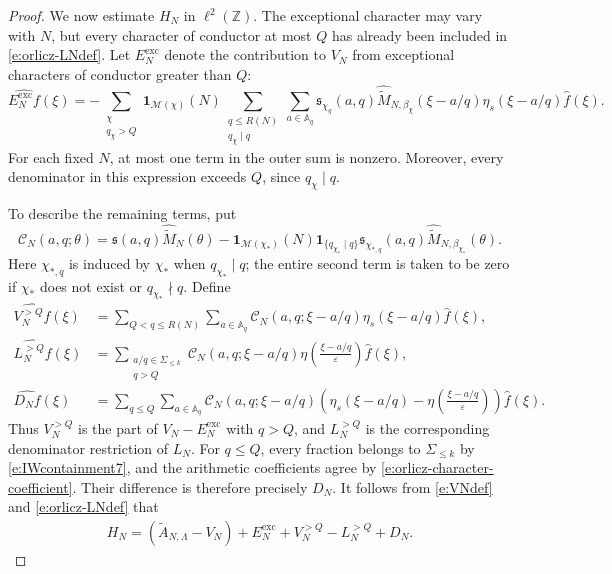 \documentclass[12pt,reqno]{amsart}
\numberwithin{equation}{section}
\theoremstyle{definition}
\theoremstyle{remark}
\begin{document}
\begin{proof}
We now estimate \(H_N\) in \(\ell^2(\mathbb Z)\).
The exceptional character may vary with \(N\), but every character
of conductor at most \(Q\) has already been included in
\eqref{e:orlicz-LNdef}. Let \(E_N^{\mathrm{exc}}\) denote the
contribution to \(V_N\) from exceptional characters of conductor
greater than \(Q\):
\[
 \widehat{E_N^{\mathrm{exc}}f}(\xi)
 =
 -
 \sum_{\substack{\chi\\q_\chi>Q}}
 \mathbf1_{\mathcal M(\chi)}(N)
 \sum_{\substack{q\leq R(N)\\q_\chi\mid q}}
 \sum_{a\in\mathbb A_q}
 \mathfrak s_{\chi_q}(a,q)
 \widehat{\widetilde M}_{N,\beta_\chi}(\xi-a/q)
 \eta_s(\xi-a/q)\widehat f(\xi).
\]
For each fixed \(N\), at most one term in the outer sum is nonzero.
Moreover, every denominator in this expression exceeds \(Q\),
since \(q_\chi\mid q\).

To describe the remaining terms, put
\[
 \mathcal C_N(a,q;\theta)
 =
 \mathfrak s(a,q)\widehat{\widetilde M}_N(\theta)
 -
 \mathbf1_{\mathcal M(\chi_*)}(N)
 \mathbf1_{\{q_{\chi_*}\mid q\}}
 \mathfrak s_{\chi_{*,q}}(a,q)
 \widehat{\widetilde M}_{N,\beta_{\chi_*}}(\theta).
\]
Here \(\chi_{*,q}\) is induced by \(\chi_*\) when
\(q_{\chi_*}\mid q\); the entire second term is taken to be zero
if \(\chi_*\) does not exist or \(q_{\chi_*}\nmid q\).
Define
\begin{align*}
 \widehat{V_N^{>Q}f}(\xi)
 &=
 \sum_{Q<q\leq R(N)}\sum_{a\in\mathbb A_q}
 \mathcal C_N(a,q;\xi-a/q)
 \eta_s(\xi-a/q)\widehat f(\xi),\\
 \widehat{L_N^{>Q}f}(\xi)
 &=
 \sum_{\substack{a/q\in\Sigma_{\leq k}\\q>Q}}
 \mathcal C_N(a,q;\xi-a/q)
 \eta\left(\frac{\xi-a/q}{\varepsilon}\right)\widehat f(\xi),\\
 \widehat{D_Nf}(\xi)
 &=
 \sum_{q\leq Q}\sum_{a\in\mathbb A_q}
 \mathcal C_N(a,q;\xi-a/q)
 \left(
 \eta_s(\xi-a/q)
 -
 \eta\left(\frac{\xi-a/q}{\varepsilon}\right)
 \right)\widehat f(\xi).
\end{align*}
Thus \(V_N^{>Q}\) is the part of \(V_N-E_N^{\mathrm{exc}}\)
with \(q>Q\), and \(L_N^{>Q}\) is the corresponding denominator
restriction of \(L_N\). For \(q\leq Q\), every fraction belongs to
\(\Sigma_{\leq k}\) by \eqref{e:IWcontainment7}, and the arithmetic
coefficients agree by \eqref{e:orlicz-character-coefficient}.
Their difference is therefore precisely \(D_N\).
It follows from \eqref{e:VNdef} and \eqref{e:orlicz-LNdef} that
\begin{align}\label{e:orlicz-Hdecomposition}
 H_N
 =
 (\widetilde A_{N,\Lambda}-V_N)
 +E_N^{\mathrm{exc}}
 +V_N^{>Q}-L_N^{>Q}+D_N.
\end{align}


\end{proof}
\end{document}
